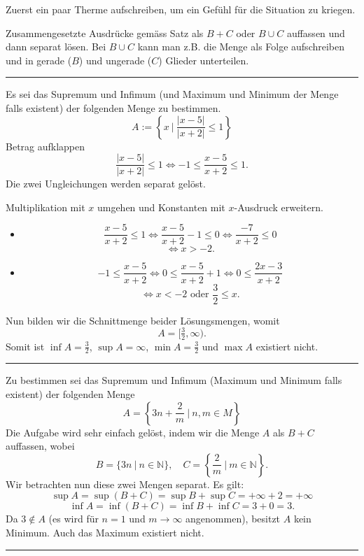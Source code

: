 \documentclass[a4paper,landscape,8pt]{extarticle}
\newcommand{\N}{\mathbb{N}}
\newcommand{\abs}[1]{\left\lvert #1 \right\rvert}
\newcommand{\setsep}{\ \vert \ }
\newcommand{\sep}{\vspace{5pt}\noindent\hrule\vspace{5pt}}
\begin{document}
\begin{multicols*}{4}
\Trick Zuerst ein paar Therme aufschreiben, um ein Gefühl für die Situation zu
kriegen.

\Trick Zusammengesetzte Ausdrücke gemäss Satz als $B+C$ oder $B\cup C$ auffassen
und dann separat lösen. Bei $B\cup C$ kann man z.B. die Menge als Folge
aufschreiben und in gerade ($B$) und ungerade ($C$) Glieder unterteilen.

\begin{warmup}
\sep

\Bsp Es sei das Supremum und Infimum (und Maximum und Minimum der Menge falls
existent) der folgenden Menge zu bestimmen.
\[
A := \left\{x \setsep \frac{\abs{x-5}}{\abs{x+2}}\leq 1\right\}
\]
\Trick Betrag aufklappen
\[
\frac{\abs{x-5}}{\abs{x+2}}\leq 1 \Longleftrightarrow -1 \leq \frac{x-5}{x+2}
\leq 1.
\]
Die zwei Ungleichungen werden separat gelöst.

\Trick Multiplikation mit $x$ umgehen und Konstanten mit $x$-Ausdruck erweitern.

\begin{itemize}
  \item \[
\frac{x-5}{x+2} \leq 1 \Longleftrightarrow
\frac{x-5}{x+2} -1 \leq 0 \Longleftrightarrow
\frac{-7}{x+2} \leq 0 
\]
\[
\Longleftrightarrow x > -2 .
\]
\item \[
-1 \leq \frac{x-5}{x+2} \Longleftrightarrow
0 \leq \frac{x-5}{x+2}+1  \Longleftrightarrow
0 \leq \frac{2x-3}{x+2}
\]
\[
\Longleftrightarrow x<-2 \text{ oder } \frac{3}{2} \leq x.
\]
\end{itemize}

Nun bilden wir die Schnittmenge beider Lösungsmengen, womit
\[
A=[\tfrac{3}{2},\infty).
\]
Somit ist $\inf A = \tfrac{3}{2}$, $\sup A = \infty$, $\min A = \tfrac{3}{2}$
und $\max A$ existiert nicht.

\sep

\Bsp Zu bestimmen sei das Supremum und Infimum (Maximum und Minimum falls
existent) der folgenden Menge
\[
A= \left\{3n+\frac{2}{m} \setsep n,m\in M\right \}
\]
Die Aufgabe wird sehr einfach gelöst, indem wir die Menge $A$ als $B+C$
auffassen, wobei
\[
B = \{3n \setsep n\in \N\}, \quad C= \left\{\frac{2}{m}\setsep m\in \N\right\}.
\]
Wir betrachten nun diese zwei Mengen separat. Es gilt:
\[
\sup A = \sup (B+C) = \sup B + \sup C = +\infty + 2 = +\infty
\]
\[
\inf A = \inf (B+C) = \inf B + \inf C = 3 + 0 = 3.
\]
Da $3\not\in A$ (es wird für $n=1$ und $m\to\infty$ angenommen), besitzt $A$
kein Minimum. Auch das Maximum existiert nicht.

\sep


\end{warmup}
\end{multicols*}
\end{document}
